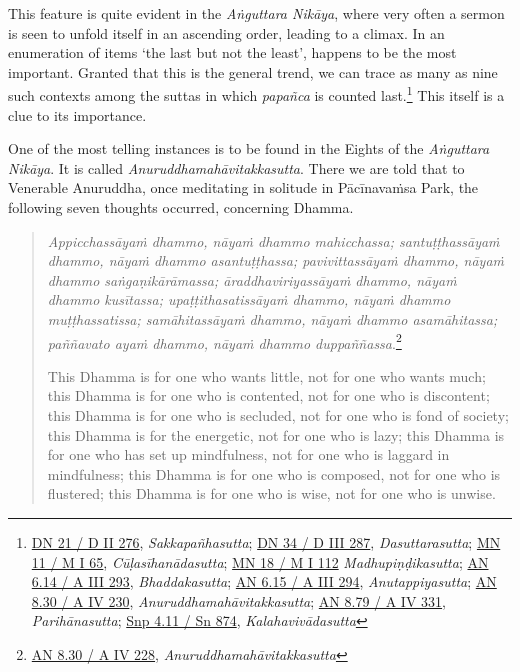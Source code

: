 This feature is quite evident in the \emph{Aṅguttara Nikāya}, where very often a sermon is seen to unfold itself in an ascending order, leading to a climax. In an enumeration of items `the last but not the least', happens to be the most important. Granted that this is the general trend, we can trace as many as nine such contexts among the suttas in which \emph{papañca} is counted last.\footnote{\href{https://suttacentral.net/dn21/pli/ms}{DN 21 / D II 276}, \emph{Sakkapañhasutta}; \href{https://suttacentral.net/dn34/pli/ms}{DN 34 / D III 287}, \emph{Dasuttarasutta}; \href{https://suttacentral.net/mn11/pli/ms}{MN 11 / M I 65}, \emph{Cūḷasīhanādasutta}; \href{https://suttacentral.net/mn18/pli/ms}{MN 18 / M I 112} \emph{Madhupiṇḍikasutta}; \href{https://suttacentral.net/an6.14/pli/ms}{AN 6.14 / A III 293}, \emph{Bhaddakasutta}; \href{https://suttacentral.net/an6.15/pli/ms}{AN 6.15 / A III 294}, \emph{Anutappiyasutta}; \href{https://suttacentral.net/an8.30/pli/ms}{AN 8.30 / A IV 230}, \emph{Anuruddhamahāvitakkasutta}; \href{https://suttacentral.net/an8.79/pli/ms}{AN 8.79 / A IV 331}, \emph{Parihānasutta}; \href{https://suttacentral.net/snp4.11/pli/ms}{Snp 4.11 / Sn 874}, \emph{Kalahavivādasutta}} This itself is a clue to its importance.

One of the most telling instances is to be found in the Eights of the \emph{Aṅguttara Nikāya}. It is called \emph{Anuruddhamahāvitakkasutta}. There we are told that to Venerable Anuruddha, once meditating in solitude in Pācīnavaṁsa Park, the following seven thoughts occurred, concerning Dhamma.

\begin{quote}
\emph{Appicchassāyaṁ dhammo, nāyaṁ dhammo mahicchassa; santuṭṭhassāyaṁ dhammo, nāyaṁ dhammo asantuṭṭhassa; pavivittassāyaṁ dhammo, nāyaṁ dhammo saṅgaṇikārāmassa; āraddhaviriyassāyaṁ dhammo, nāyaṁ dhammo kusītassa; upaṭṭithasatissāyaṁ dhammo, nāyaṁ dhammo muṭṭhassatissa; samāhitassāyaṁ dhammo, nāyaṁ dhammo asamāhitassa; paññavato ayaṁ dhammo, nāyaṁ dhammo duppaññassa}.\footnote{\href{https://suttacentral.net/an8.30/pli/ms}{AN 8.30 / A IV 228}, \emph{Anuruddhamahāvitakkasutta}}

This Dhamma is for one who wants little, not for one who wants much; this Dhamma is for one who is contented, not for one who is discontent; this Dhamma is for one who is secluded, not for one who is fond of society; this Dhamma is for the energetic, not for one who is lazy; this Dhamma is for one who has set up mindfulness, not for one who is laggard in mindfulness; this Dhamma is for one who is composed, not for one who is flustered; this Dhamma is for one who is wise, not for one who is unwise.
\end{quote}


